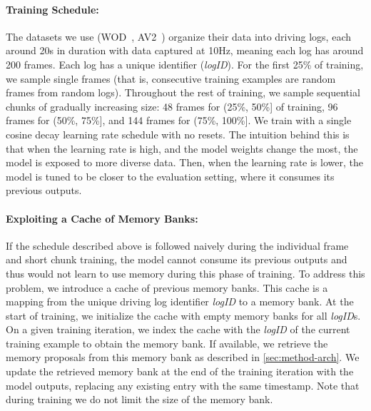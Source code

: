 \paragraph{Training Schedule:}

The datasets we use (WOD~\cite{WOD}, AV2~\cite{wilson2023argoverse}) organize their data into driving logs, each around 20s in duration with data captured at 10Hz,
meaning each log has around 200 frames.
Each log has a unique identifier (\textit{logID}).
For the first 25\% of training, we sample single frames (that is, consecutive training examples are random frames from random logs).
Throughout the rest of training, we sample sequential chunks of gradually increasing size: 48 frames for (25\%, 50\%] of training,
96 frames for (50\%, 75\%], and 144 frames for (75\%, 100\%].
We train with a single cosine decay learning rate schedule with no resets.
The intuition behind this is that when the learning rate is high, and the model weights change the most, the model is exposed to more diverse data.
Then, when the learning rate is lower, the model is tuned to be closer to the evaluation setting, where it consumes its previous outputs.

\paragraph{Exploiting a Cache of Memory Banks:}
If the schedule described above is followed naively during the individual frame and short chunk training, the model cannot consume its previous outputs and thus would not learn to use memory during this phase of training.
To address this problem, we introduce a cache of previous memory banks. This cache is a mapping from the unique driving log identifier \textit{logID} to a memory bank. At the start of training, we initialize the cache with empty memory banks for all \textit{logID}s.
On a given training iteration, we index the cache with the \textit{logID} of the current training example to obtain the memory bank.
If available, we retrieve the memory proposals from this memory bank as described in \cref{sec:method-arch}.
We update the retrieved memory bank at the end of the training iteration with the model outputs,
replacing any existing entry with the same timestamp.
Note that during training we do not limit the size of the memory bank.

